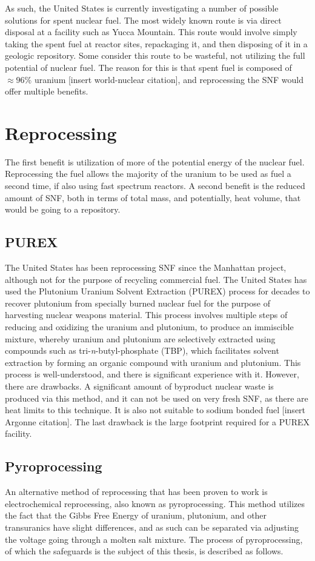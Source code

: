 As such, the United States is currently investigating a number of possible solutions for spent nuclear fuel. The most widely known route is via direct disposal at a facility such as Yucca Mountain. This route would involve simply taking the spent fuel at reactor sites, repackaging it, and then disposing of it in a geologic repository. Some consider this route to be wasteful, not utilizing the full potential of nuclear fuel. The reason for this is that spent fuel is composed of $\approx 96\%$ uranium [insert world-nuclear citation], and reprocessing the SNF would offer multiple benefits. 

\section{Reprocessing}
The first benefit is utilization of more of the potential energy of the nuclear fuel. Reprocessing the fuel allows the majority of the uranium to be used as fuel a second time, if also using fast spectrum reactors. A second benefit is the reduced amount of SNF, both in terms of total mass, and potentially, heat volume, that would be going to a repository. 

\subsection{PUREX}
The United States has been reprocessing SNF since the Manhattan project, although not for the purpose of recycling commercial fuel. The United States has used the Plutonium Uranium Solvent Extraction (PUREX) process for decades to recover plutonium from specially burned nuclear fuel for the purpose of harvesting nuclear weapons material. This process involves multiple steps of reducing and oxidizing the uranium and plutonium, to produce an immiscible mixture, whereby uranium and plutonium are selectively extracted using compounds such as tri-\textit{n}-butyl-phosphate (TBP), which facilitates solvent extraction by forming an organic compound with uranium and plutonium. This process is well-understood, and there is significant experience with it. However, there are drawbacks. A significant amount of byproduct nuclear waste is produced via this method, and it can not be used on very fresh SNF, as there are heat limits to this technique. It is also not suitable to sodium bonded fuel [insert Argonne citation]. The last drawback is the large footprint required for a PUREX facility. 

\subsection{Pyroprocessing}
An alternative method of reprocessing that has been proven to work is electrochemical reprocessing, also known as pyroprocessing. This method utilizes the fact that the Gibbs Free Energy of uranium, plutonium, and other transuranics have slight differences, and as such can be separated via adjusting the voltage going through a molten salt mixture. The process of pyroprocessing, of which the safeguards is the subject of this thesis, is described as follows. \\ %

